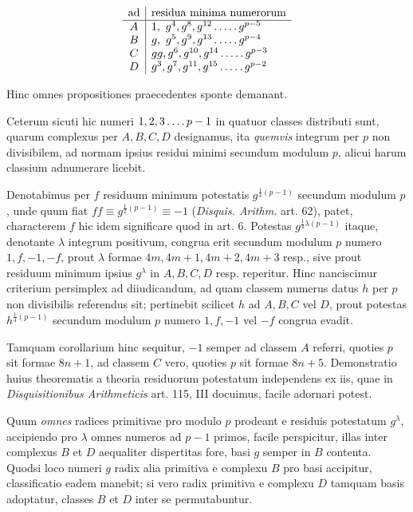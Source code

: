 %
\[
\begin{array}{c|l}
\text{ad}&\text{residua minima numerorum}\\\hline
A&1,\ g^4,g^8,g^{12}\mathinner{.\,.\,.\,.\,.} g^{p-5}\\
B&g,\ g^5,g^9,g^{13}\mathinner{.\,.\,.\,.\,.} g^{p-4}\\
C&gg,g^6,g^{10},g^{14}\mathinner{.\,.\,.\,.\,.} g^{p-3}\\
D&g^3,g^7,g^{11},g^{15}\mathinner{.\,.\,.\,.\,.} g^{p-2}
\end{array}
\]

Hinc omnes propositiones praecedentes sponte demanant.

Ceterum sicuti hic numeri $1,2,3\mathinner{.\,.\,.\,.} p-1$ in quatuor classes distributi sunt, quarum complexus per $A,B,C,D$ designamus, ita \emph{quemvis} integrum per $p$ non divisibilem, ad normam ipsius residui minimi secundum modulum $p$, alicui harum classium adnumerare licebit.

Denotabimus per $f$ residuum minimum potestatis $g^{\frac14(p-1)}$ secundum modulum $p$, unde quum fiat $ff\equiv g^{\frac12(p-1)}\equiv-1$ (\emph{Disquis. Arithm.} art. 62), patet, characterem $f$ hic idem significare quod in art. 6. Potestas $g^{\frac14\lambda(p-1)}$ itaque, denotante $\lambda$ integrum positivum, congrua erit secundum modulum $p$ numero $1,f,-1,-f$, prout $\lambda$ formae $4m,4m+1,4m+2,4m+3$ resp., sive prout residuum minimum ipsius $g^\lambda$ in $A,B,C,D$ resp. reperitur. Hinc nanciscimur criterium persimplex ad diiudicandum, ad quam classem numerus datus $h$ per $p$ non divisibilis referendus sit; pertinebit scilicet $h$ ad $A,B,C$ vel $D$, prout potestas $h^{\frac14(p-1)}$ secundum modulum $p$ numero $1,f,-1$ vel $-f$ congrua evadit.

Tamquam corollarium hinc sequitur, $-1$ semper ad classem $A$ referri, quoties $p$ sit formae $8n+1$, ad classem $C$ vero, quoties $p$ sit formae $8n+5$. Demonstratio huius theorematis a theoria residuorum potestatum independens ex iis, quae in \emph{Disquisitionibus Arithmeticis} art. 115, III docuimus, facile adornari potest.

Quum \emph{omnes} radices primitivae pro modulo $p$ prodeant e residuis potestatum $g^\lambda$, accipiendo pro $\lambda$ omnes numeros ad $p-1$ primos, facile perspicitur, illas inter complexus $B$ et $D$ aequaliter dispertitas fore, basi $g$ semper in $B$ contenta. Quodsi loco numeri $g$ radix alia primitiva e complexu $B$ pro basi accipitur, classificatio eadem manebit; si vero radix primitiva e complexu $D$ tamquam basis adoptatur, classes $B$ et $D$ inter se permutabuntur.

